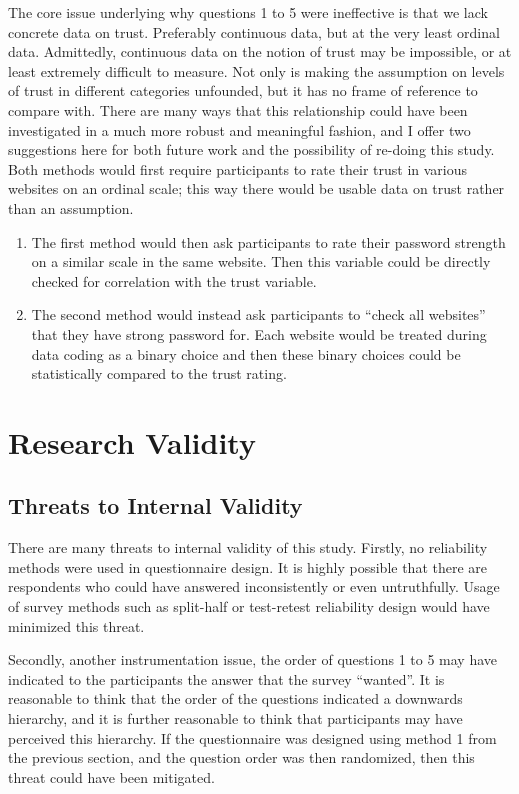 \documentclass[letterpaper, 10 pt, conference]{ieeeconf}  %
\begin{document}
The core issue underlying why questions 1 to 5 were ineffective is that we lack concrete data on trust. Preferably continuous data, but at the very least ordinal data. Admittedly, continuous data on the notion of trust may be impossible, or at least extremely difficult to measure. Not only is making the assumption on levels of trust in different categories unfounded, but it has no frame of reference to compare with. There are many ways that this relationship could have been investigated in a much more robust and meaningful fashion, and I offer two suggestions here for both future work and the possibility of re-doing this study. Both methods would first require participants to rate their trust in various websites on an ordinal scale; this way there would be usable data on trust rather than an assumption.

\begin{enumerate}
\item The first method would then ask participants to rate their password strength on a similar scale in the same website. Then this variable could be directly checked for correlation with the trust variable.
\item The second method would instead ask participants to “check all websites” that they have strong password for. Each website would be treated during data coding as a binary choice and then these binary choices could be statistically compared to the trust rating. 
\end{enumerate}

\section{Research Validity}
\subsection{Threats to Internal Validity}\label{sec:internalvalidity}

There are many threats to internal validity of this study. Firstly, no reliability methods were used in questionnaire design. It is highly possible that there are respondents who could have answered inconsistently or even untruthfully. Usage of survey methods such as split-half or test-retest reliability design would have minimized this threat. 

Secondly, another instrumentation issue, the order of questions 1 to 5 may have indicated to the participants the answer that the survey “wanted”. It is reasonable to think that the order of the questions indicated a downwards hierarchy, and it is further reasonable to think that participants may have perceived this hierarchy. If the questionnaire was designed using method 1 from the previous section, and the question order was then randomized, then this threat could have been mitigated.
\end{document}
